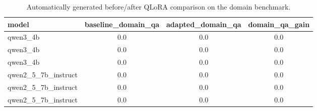 \begin{table}[t]
\centering
\caption{Automatically generated before/after QLoRA comparison on the domain benchmark.}
\label{tab:generated-qlora-results}
\begin{tabular}{lccc}
\toprule
model & baseline\_domain\_qa & adapted\_domain\_qa & domain\_qa\_gain \\
\midrule
qwen3\_4b & 0.0 & 0.0 & 0.0 \\
qwen3\_4b & 0.0 & 0.0 & 0.0 \\
qwen3\_4b & 0.0 & 0.0 & 0.0 \\
qwen2\_5\_7b\_instruct & 0.0 & 0.0 & 0.0 \\
qwen2\_5\_7b\_instruct & 0.0 & 0.0 & 0.0 \\
qwen2\_5\_7b\_instruct & 0.0 & 0.0 & 0.0 \\
\bottomrule
\end{tabular}
\end{table}
